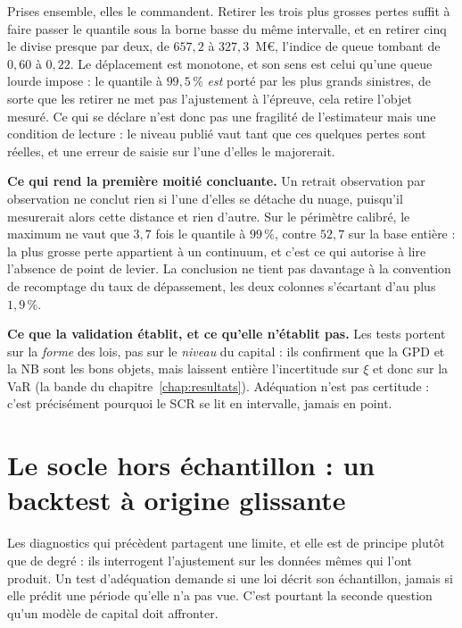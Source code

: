 Prises ensemble, elles le commandent. Retirer les trois plus grosses pertes suffit à faire
passer le quantile sous la borne basse du même intervalle, et en retirer cinq le divise presque
par deux, de $657{,}2$ à $327{,}3$~M\euro, l'indice de queue tombant de $0{,}60$ à $0{,}22$. Le
déplacement est monotone, et son sens est celui qu'une queue lourde impose : le quantile à
$99{,}5\,\%$ \emph{est} porté par les plus grands sinistres, de sorte que les retirer ne met pas
l'ajustement à l'épreuve, cela retire l'objet mesuré. Ce qui se déclare n'est donc pas une
fragilité de l'estimateur mais une condition de lecture : le niveau publié vaut tant que ces
quelques pertes sont réelles, et une erreur de saisie sur l'une d'elles le majorerait.

\begin{attention}
\textbf{Ce qui rend la première moitié concluante.} Un retrait observation par observation ne
conclut rien si l'une d'elles se détache du nuage, puisqu'il mesurerait alors cette distance et
rien d'autre. Sur le périmètre calibré, le maximum ne vaut que $3{,}7$ fois le quantile à
$99\,\%$, contre $52{,}7$ sur la base entière : la plus grosse perte appartient à un continuum,
et c'est ce qui autorise à lire l'absence de point de levier. La conclusion ne tient pas
davantage à la convention de recomptage du taux de dépassement, les deux colonnes s'écartant
d'au plus $1{,}9\,\%$.
\end{attention}

\begin{cle}
\textbf{Ce que la validation établit, et ce qu'elle n'établit pas.} Les tests portent sur la
\emph{forme} des lois, pas sur le \emph{niveau} du capital : ils confirment que la GPD et la
NB sont les bons objets, mais laissent entière l'incertitude sur $\xi$ et donc sur la VaR (la
bande du chapitre~\ref{chap:resultats}). Adéquation n'est pas certitude : c'est précisément
pourquoi le SCR se lit en intervalle, jamais en point.
\end{cle}


\section{Le socle hors échantillon : un backtest à origine glissante}
\label{soc:sec:backtest}

Les diagnostics qui précèdent partagent une limite, et elle est de principe plutôt que de
degré : ils interrogent l'ajustement sur les données mêmes qui l'ont produit. Un test
d'adéquation demande si une loi décrit son échantillon, jamais si elle prédit une période
qu'elle n'a pas vue. C'est pourtant la seconde question qu'un modèle de capital doit affronter.

